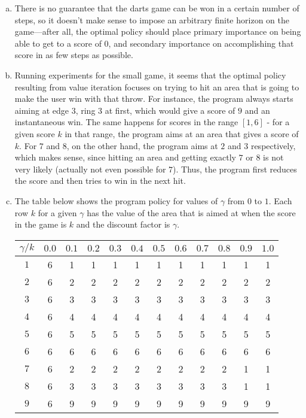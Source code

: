 \documentclass{article}
\begin{document}
\begin{enumerate}
\begin{enumerate}[(a)]
                \item There is no guarantee that the darts game can be won in a certain number of steps, so it doesn't make sense to impose an arbitrary finite horizon on the game---after all, the optimal policy should place primary importance on being able to get to a score of 0, and secondary importance on accomplishing that score in as few steps as possible.
                \item Running experiments for the small game, it seems that the optimal policy resulting from value iteration focuses on trying to hit an area that is going to make the user win with that throw. For instance, the program always starts aiming at edge $3$, ring $3$ at first, which would give a score of $9$ and an instantaneous win. The same happens for scores in the range $[1,6]$ - for a given score $k$ in that range, the program aims at an area that gives a score of $k$. For $7$ and $8$, on the other hand, the program aims at $2$ and $3$ respectively, which makes sense, since hitting an area and getting exactly $7$ or $8$ is not very likely (actually not even possible for $7$). Thus, the program first reduces the score and then tries to win in the next hit.
                
                \item The table below shows the program policy for values of $\gamma$ from $0$ to $1$. Each row $k$ for a given $\gamma$ has the value of the area that is aimed at when the score in the game is $k$ and the discount factor is $\gamma$.
                
                \begin{center} \begin{tabular}[h]{|c|c|c|c|c|c|c|c|c|c|c|c|} \hline
                $\gamma/k$ & $0.0$ & $0.1$ & $0.2$ & $0.3$ & $0.4$ & $0.5$ & $0.6$ & $0.7$ & $0.8$ & $0.9$ & $1.0$ \\ \hline
                $1$ & 6 & 1 & 1 & 1 & 1 & 1 & 1 & 1 & 1 & 1 & 1 \\
                $2$ & 6 & 2 & 2 & 2 & 2 & 2 & 2 & 2 & 2 & 2 & 2 \\
                $3$ & 6 & 3 & 3 & 3 & 3 & 3 & 3 & 3 & 3 & 3 & 3 \\
                $4$ & 6 & 4 & 4 & 4 & 4 & 4 & 4 & 4 & 4 & 4 & 4 \\
                $5$ & 6 & 5 & 5 & 5 & 5 & 5 & 5 & 5 & 5 & 5 & 5 \\
                $6$ & 6 & 6 & 6 & 6 & 6 & 6 & 6 & 6 & 6 & 6 & 6 \\
                $7$ & 6 & 2 & 2 & 2 & 2 & 2 & 2 & 2 & 2 & 1 & 1 \\
                $8$ & 6 & 3 & 3 & 3 & 3 & 3 & 3 & 3 & 3 & 1 & 1 \\
                $9$ & 6 & 9 & 9 & 9 & 9 & 9 & 9 & 9 & 9 & 9 & 9 \\ \hline
                \end{tabular} \end{center}


\end{enumerate}
\end{enumerate}
\end{document}
